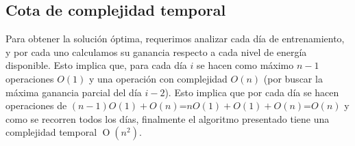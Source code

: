 \subsection{Cota de complejidad temporal}

Para obtener la solución óptima, requerimos analizar cada día de entrenamiento, y por cada uno 
calculamos su ganancia respecto a cada nivel de energía disponible.
Esto implica que, para cada día $i$ se hacen como máximo $n-1$ operaciones $O(1)$ y una operación con complejidad $O(n)$ (por buscar
la máxima ganancia parcial del día $i-2$). 
Esto implica que por cada día se hacen operaciones de $(n-1)O(1)+O(n)$=$nO(1)+O(1)+O(n)$=$O(n)$ y como se 
recorren todos los días, finalmente el algoritmo presentado tiene una complejidad temporal $\operatorname{O}(n^2)$.
